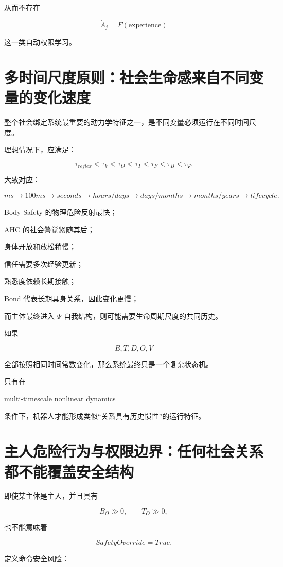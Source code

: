 从而不存在

\[
\dot A_j
=
F(\mathrm{experience})
\]

这一类自动权限学习。


\section{多时间尺度原则：社会生命感来自不同变量的变化速度}

整个社会绑定系统最重要的动力学特征之一，是不同变量必须运行在不同时间尺度。

理想情况下，应满足：

\[
\boxed{
\tau_{reflex}
<
\tau_V
<
\tau_O
<
\tau_T
<
\tau_F
<
\tau_B
<
\tau_\Psi.
}
\]

大致对应：

\[
ms
\rightarrow
100ms
\rightarrow
seconds
\rightarrow
hours/days
\rightarrow
days/months
\rightarrow
months/years
\rightarrow
lifecycle.
\]

Body Safety 的物理危险反射最快；

AHC 的社会警觉紧随其后；

身体开放和放松稍慢；

信任需要多次经验更新；

熟悉度依赖长期接触；

Bond 代表长期具身关系，因此变化更慢；

而主体最终进入 $\Psi$ 自我结构，则可能需要生命周期尺度的共同历史。

如果

\[
B,T,D,O,V
\]

全部按照相同时间常数变化，那么系统最终只是一个复杂状态机。

只有在

\begin{statementbox}
multi-timescale nonlinear dynamics
\end{statementbox}

条件下，机器人才能形成类似“关系具有历史惯性”的运行特征。


\section{主人危险行为与权限边界：任何社会关系都不能覆盖安全结构}

即使某主体是主人，并且具有

\[
B_O\gg0,
\qquad
T_O\gg0,
\]

也不能意味着

\[
SafetyOverride=True.
\]

定义命令安全风险：

